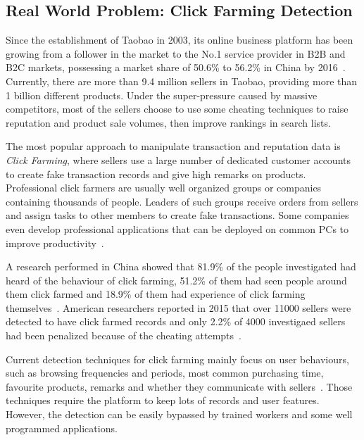 \documentclass[10pt,conference,letterpaper]{IEEEtran}
\begin{document}
		\subsection{Real World Problem: Click Farming Detection}\label{sec:related-realworld}
			Since the establishment of Taobao in 2003, its online business platform has been growing from a follower in the market to the No.1 service provider in B2B and B2C markets, possessing a market share of 50.6\% to 56.2\% in China by 2016~\cite{iresearch2016b2c}. Currently, there are more than 9.4 million sellers in Taobao, providing more than 1 billion different products. Under the super-pressure caused by massive competitors, most of the sellers choose to use some cheating techniques to raise reputation and product sale volumes, then improve rankings in search lists.
			
			The most popular approach to manipulate transaction and reputation data is \textit{Click Farming}, where sellers use a large number of dedicated customer accounts to create fake transaction records and give high remarks on products. Professional click farmers are usually well organized groups or companies containing thousands of people. Leaders of such groups receive orders from sellers and assign tasks to other members to create fake transactions. Some companies even develop professional applications that can be deployed on common PCs to improve productivity~\cite{zhao2016on}.
	
			A research performed in China showed that 81.9\% of the people investigated had heard of the behaviour of click farming, 51.2\% of them had seen people around them click farmed and 18.9\% of them had experience of click farming themselves~\cite{yan2015report}. American researchers reported in 2015 that over 11000 sellers were detected to have click farmed records and only 2.2\% of 4000 investigaed sellers had been penalized because of the cheating attempts~\cite{netease2015research}.
			
			Current detection techniques for click farming mainly focus on user behaviours, such as browsing frequencies and periods, most common purchasing time, favourite products, remarks and whether they communicate with sellers~\cite{simpleDetection}. Those techniques require the platform to keep lots of records and user features. However, the detection can be easily bypassed by trained workers and some well programmed applications.
	
\end{document}
